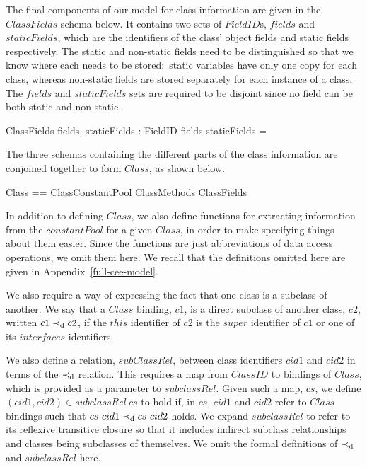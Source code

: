 The final components of our model for class information are given in
the $ClassFields$ schema below.
It contains two sets of $FieldID$s, $fields$ and $staticFields$, which
are the identifiers of the class' object fields and static fields
respectively.
The static and non-static fields need to be distinguished so that we
know where each needs to be stored:~static variables have only one
copy for each class, whereas non-static fields are stored separately
for each instance of a class.
The $fields$ and $staticFields$ sets are required to be disjoint since
no field can be both static and non-static.
\begin{schema}{ClassFields}
  fields, staticFields : \finset FieldID
\where
  fields \cap staticFields = \emptyset
\end{schema}

The three schemas containing the different parts of the class
information are conjoined together to form $Class$, as shown below.
\begin{zed}
  Class == ClassConstantPool \land ClassMethods \land ClassFields
\end{zed}

In addition to defining $Class$, we also define functions for
extracting information from the $constantPool$ for a given $Class$, in
order to make specifying things about them easier.
Since the functions are just abbreviations of data access operations,
we omit them here.
We recall that the definitions omitted here are given in
Appendix~\ref{full-cee-model}.

We also require a way of expressing the fact that one class is a
subclass of another.
We say that a $Class$ binding, $c1$, is a direct subclass of another
class, $c2$, written $c1 \prec_{\mathrm{d}} c2$, if the $this$ identifier
of $c2$ is the $super$ identifier of $c1$ or one of its $interfaces$
identifiers.

We also define a relation, $subClassRel$, between class identifiers
$cid1$ and $cid2$ in terms of the $\prec_{\mathrm{d}}$ relation.
This requires a map from $ClassID$ to bindings of $Class$, which is
provided as a parameter to $subclassRel$.
Given such a map, $cs$, we define $(cid1,cid2) \in subclassRel~cs$ to
hold if, in $cs$, $cid1$ and $cid2$ refer to $Class$ bindings such
that $cs~cid1 \prec_{\mathrm{d}} cs~cid2$ holds.
We expand $subclassRel$ to refer to its reflexive transitive closure
so that it includes indirect subclass relationships and classes being
subclasses of themselves.
We omit the formal definitions of $\prec_{\mathrm{d}}$ and $subclassRel$
here.

